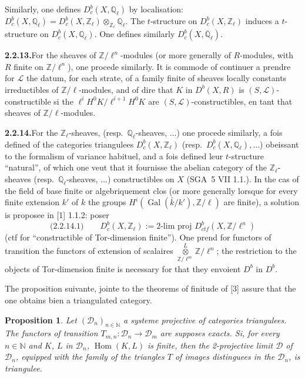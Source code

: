 \documentclass[12pt,a4paper]{article}
\theoremstyle{plain}
\newtheorem{proposition}[theorem]{Proposition}
\theoremstyle{definition}
\DeclareMathOperator{\Hom}{Hom}
\DeclareMathOperator{\Gal}{Gal}
\begin{document}
Similarly, one defines $D_c^b(X, \mathbb{Q}_\ell)$ by localisation: $D_c^b(X, \mathbb{Q}_\ell) = D_c^b(X, \mathbb{Z}_\ell) \otimes_{\mathbb{Z}_\ell} \mathbb{Q}_\ell$. The $t$-structure on $D_c^b(X, \mathbb{Z}_\ell)$ induces a $t$-structure on $D_c^b(X, \mathbb{Q}_\ell)$. One defines similarly $D_c^b(X, \overline{\mathbb{Q}}_\ell)$.

\smallskip
\noindent\textbf{2.2.13.}\quad For the sheaves of $\mathbb{Z}/\ell^n$-modules (or more generally of $R$-modules, with $R$ finite on $\mathbb{Z}/\ell^n$), one procede similarly. It is commode of continuer a prendre for $\mathcal{L}$ the datum, for each strate, of a family finite of sheaves locally constants irreductibles of $\mathbb{Z}/\ell$-modules, and of dire that $K$ in $D^b(X, R)$ is $(S, \mathcal{L})$-constructible si the $\ell^i H^0 K / \ell^{i+1} H^0 K$ are $(S, \mathcal{L})$-constructibles, en tant that sheaves of $\mathbb{Z}/\ell$-modules.

\smallskip
\noindent\textbf{2.2.14.}\quad For the $\mathbb{Z}_\ell$-sheaves, (resp.\ $\mathbb{Q}_\ell$-sheaves, $\ldots$) one procede similarly, a fois defined of the categories triangulees $D_c^b(X, \mathbb{Z}_\ell)$ (resp.\ $D_c^b(X, \mathbb{Q}_\ell), \ldots$) obeissant to the formalism of variance habituel, and a fois defined leur $t$-structure ``natural'', of which one veut that it fournisse the abelian category of the $\mathbb{Z}_\ell$-sheaves (resp.\ $\mathbb{Q}_\ell$-sheaves, $\ldots$) constructibles on $X$ (SGA~5 VII 1.1.). In the cas of the field of base finite or algebriquement clos (or more generally lorsque for every finite extension $k'$ of $k$ the groups $H^i(\Gal(\bar{k}/k'), \mathbb{Z}/\ell)$ are finite), a solution is proposee in [1] 1.1.2: poser
\[
\text{(2.2.14.1)}\qquad D_c^b(X, \mathbb{Z}_\ell) := \text{2-lim proj } D_{ctf}^b(X, \mathbb{Z}/\ell^n)
\]
(ctf for ``constructible of Tor-dimension finite''). One prend for functors of transition the functors of extension of scalaires $\overset{L}{\underset{\mathbb{Z}/\ell^m}{\otimes}} \mathbb{Z}/\ell^n$; the restriction to the objects of Tor-dimension finite is necessary for that they envoient $D^b$ in $D^b$.

The proposition suivante, jointe to the theorems of finitude of [3] assure that the one obtains bien a triangulated category.

\begin{proposition}\label{prop:2.2.15}
Let $(\mathcal{D}_n)_{n \in \mathbb{N}}$ a systeme projective of categories triangulees. The functors of transition $T_{m,n} : \mathcal{D}_n \to \mathcal{D}_m$ are supposes exacts. Si, for every $n \in \mathbb{N}$ and $K$, $L$ in $\mathcal{D}_n$, $\Hom(K,L)$ is finite, then the 2-projective limit $\mathcal{D}$ of $\mathcal{D}_n$, equipped with the family of the triangles $T$ of images distinguees in the $\mathcal{D}_n$, is triangulee.
\end{proposition}
\end{document}
